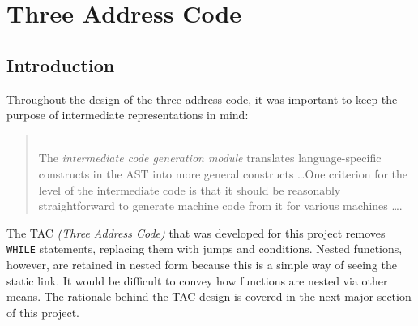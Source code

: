 \chapter{Three Address Code}
\section{Introduction}
\label{sec:tacintro}
Throughout the design of the three address code, it was important to keep the purpose of intermediate representations in mind:

\begin{quotation}
	\ \\The \emph{intermediate code generation module} translates language-specific constructs in the AST into more general constructs \ldots One criterion for the level of the intermediate code is that it should be reasonably straightforward to generate machine code from it for various machines \ldots \cite{grune2000}.
\end{quotation}

The TAC \emph{(Three Address Code)} that was developed for this project removes \verb!WHILE! statements, replacing them with jumps and conditions. Nested functions, however, are retained in nested form because this is a simple way of seeing the static link. It would be difficult to convey how functions are nested via other means. The rationale behind the TAC design is covered in the next major section of this project.